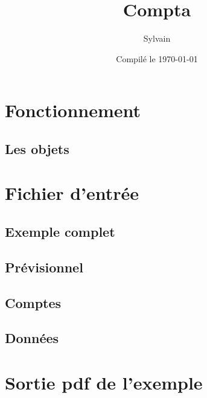 \documentclass[a4paper,french]{report}
\begin{document}
\author{Sylvain}
\date{Compilé le \today}
\title{Compta \theversion}

\maketitle

\tableofcontents
\newpage



\chapter{Fonctionnement}
\label{chap:func}
\section{Les objets}

\label{sec:object}

\chapter{Fichier d'entrée}
\section{Exemple complet}


\section{Prévisionnel}


\section{Comptes}


\section{Données}


\appendix
\chapter{Sortie pdf de l'exemple}

\end{document}
